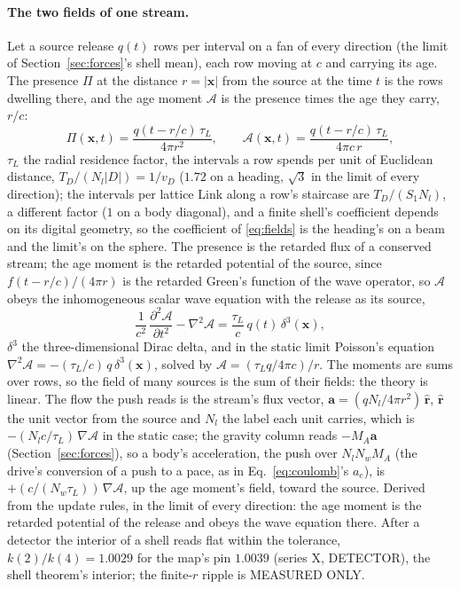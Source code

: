 \paragraph{The two fields of one stream.} Let a source release $q(t)$
rows per interval on a fan of every direction (the limit of
Section~\ref{sec:forces}'s shell mean), each row moving at $c$ and
carrying its age. The presence $\Pi$ at the distance $r = |\mathbf x|$
from the source at the time $t$ is the rows dwelling there, and the age
moment $\mathcal A$ is the presence times the age they carry, $r/c$:
\begin{equation}\label{eq:fields}
\Pi(\mathbf x, t) = \frac{q(t - r/c)\,\tau_L}{4\pi r^2}, \qquad
\mathcal A(\mathbf x, t) = \frac{q(t - r/c)\,\tau_L}{4\pi c\,r},
\end{equation}
$\tau_L$ the radial residence factor, the intervals a row spends per
unit of Euclidean distance, $T_D/(N_l|D|) = 1/v_D$ ($1.72$ on a
heading, $\sqrt3$ in the limit of every direction); the intervals per
lattice Link along a row's staircase are $T_D/(S_1 N_l)$, a different
factor ($1$ on a body diagonal), and a finite shell's coefficient
depends on its digital geometry, so the coefficient of
\eqref{eq:fields} is the heading's on a beam and the limit's on the
sphere. The presence is the retarded flux of a conserved
stream; the age moment is the retarded potential of the source, since
$f(t - r/c)/(4\pi r)$ is the retarded Green's function of the wave
operator, so $\mathcal A$ obeys the inhomogeneous scalar wave equation
with the release as its source,
\begin{equation}\label{eq:wave}
\frac{1}{c^2}\,\frac{\partial^2 \mathcal A}{\partial t^2} - \nabla^2 \mathcal A = \frac{\tau_L}{c}\,q(t)\,\delta^3(\mathbf x),
\end{equation}
$\delta^3$ the three-dimensional Dirac delta, and in the static limit
Poisson's equation $\nabla^2\mathcal A = -(\tau_L/c)\,q\,\delta^3(\mathbf
x)$, solved by $\mathcal A = (\tau_L q/4\pi c)/r$. The moments are sums
over rows, so the field of many sources is the sum of their fields: the
theory is linear. The flow the push reads is the stream's flux vector,
$\mathbf a = (qN_l/4\pi r^2)\,\hat{\mathbf r}$, $\hat{\mathbf r}$ the
unit vector from the source and $N_l$ the label each unit carries, which is $-(N_l c/\tau_L)\,\nabla \mathcal A$ in the static case; the gravity column reads $-M_A\mathbf a$ (Section~\ref{sec:forces}), so a body's acceleration, the push over $N_l N_w M_A$ (the drive's conversion of a push to a pace, as in Eq.~\eqref{eq:coulomb}'s $a_e$), is $+(c/(N_w\tau_L))\,\nabla \mathcal A$, up the age moment's field, toward the source.
Derived from the update rules, in the limit of every direction: the age moment is the retarded potential of the release and obeys the wave equation there. After a detector the interior of a shell reads flat within the tolerance, $k(2)/k(4) = 1.0029$ for the map's pin $1.0039$ (series X, DETECTOR), the shell theorem's interior; the finite-$r$ ripple is MEASURED ONLY.

